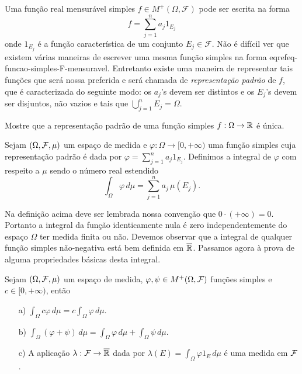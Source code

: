 Uma função real  mensurável simples 
$f\in M^{+}(\Omega,\mathcal{F})$ 
pode ser escrita na forma 
\begin{equation}\label{eq-funcao-simples-F-mensuravel}
f=\sum_{j=1}^{n}a_j 1_{E_j}
\end{equation}
onde $1_{E_j}$ é a função característica de um conjunto $E_j\in \mathcal{F}$. 
Não é difícil ver que existem várias maneiras de 
escrever uma mesma função simples na 
forma eqref{eq-funcao-simples-F-mensuravel}. 
Entretanto existe uma maneira de
representar tais funções que será nossa preferida 
e será chamada de
\emph{representação padrão}
 de $f$, 
que é caracterizada do seguinte modo: 
os $a_j$'s devem ser distintos e os $E_j$'s devem ser disjuntos, 
não vazios e tais que $\bigcup_{j=1}^nE_j=\Omega$. 
%
%
\begin{exercicio}
Mostre que a representação padrão de uma função 
simples $f:\Omega\to\mathbb{R}$ é única.
\end{exercicio}
%
%
%
%
\begin{definicao}
\label{def-integral-funcao-simples-positiva}
Sejam $(\Omega,\mathcal{F},\mu)$ um espaço de medida e 
$\varphi:\Omega\to [0,+\infty)$ uma função simples cuja representação 
padrão é dada por $\varphi = \sum_{j=1}^n a_j1_{E_j}$.
Definimos a integral de $\varphi$ com respeito a $\mu$ 
sendo o número real estendido 
	\[
		\int_{\Omega} \varphi \, d\mu 
		=
		\sum_{j=1}^n a_j\, \mu(E_j).
	\]
\end{definicao}

Na definição acima deve ser lembrada nossa convenção 
que $0\cdot(+\infty)=0$. Portanto a integral da 
função identicamente nula é zero independentemente do 
espaço $\Omega$ ter medida finita ou não. 
Devemos observar que a integral de qualquer função 
simples não-negativa está bem definida em $\overline{\mathbb{R}}$.
Passamos agora à prova de alguma propriedades 
básicas desta integral.








\begin{lema}\label{lema-lin-int-funcao-simples-positiva}
Sejam $(\Omega,\mathcal{F},\mu)$ um espaço de medida, 
$\varphi,\psi \in M^+(\Omega,\mathcal{F})$ 
funções simples e $c\in [0,+\infty)$,
então
\begin{itemize}
	\item[a)]
	\(\displaystyle 
		\int_{\Omega} c\varphi\, d\mu
		=
		c\int_{\Omega} \varphi \, d\mu.
	\)
	

	\item[b)]
	\(\displaystyle 
		\int_{\Omega} (\varphi+\psi)\, d\mu
		=
		\int_{\Omega} \varphi \, d\mu
		+
		\int_{\Omega} \psi \, d\mu.
	\)
	
	\item[c)] A aplicação $\lambda:\mathcal{F}\to\overline{\mathbb{R}}$
	dada por 
		\(\displaystyle
			\lambda(E) = \int_{\Omega} \varphi 1_{E}\, d\mu
		\)
	é uma medida em $\mathcal{F}$.
\end{itemize}
\end{lema}



